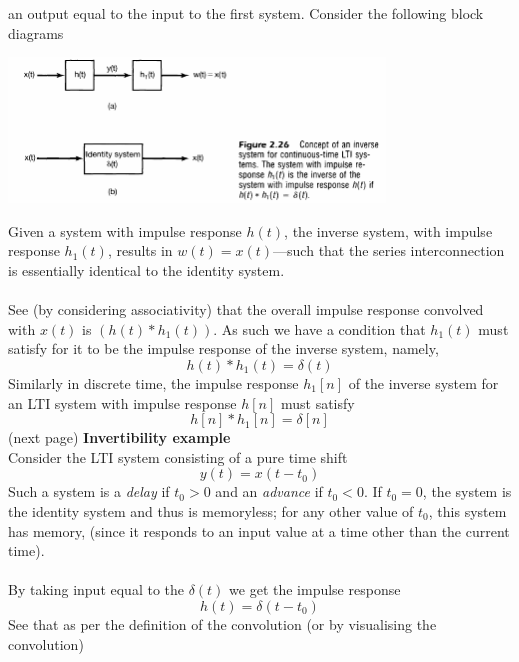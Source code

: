 \documentclass{report}
\begin{document}
an output equal to the input to the first system. Consider the following block diagrams
\begin{center}
\includegraphics[width=10cm]{a47}
\end{center}
Given a system with impulse response $h(t)$, the inverse system, with impulse response $h_1(t)$, results in $w(t)=x(t)$---such that the
series interconnection is essentially identical to the identity system.\\
\vspace{1mm}\\
See (by considering associativity) that the overall impulse response
convolved with $x(t)$ is $(h(t)*h_1(t))$. As such we have a condition
that $h_1(t)$ must satisfy for it to be the impulse response of the inverse system, namely,
\begin{equation*}
h(t)*h_1(t)=\delta(t)
\end{equation*}
Similarly in discrete time, the impulse response $h_1[n]$ of the inverse system for an LTI system with impulse response $h[n]$ must
satisfy
\begin{equation*}
h[n]*h_1[n]=\delta[n]
\end{equation*}
(next page)\newpage
\noindent\textbf{Invertibility example}\\
Consider the LTI system consisting of a pure time shift
\begin{equation*}
y(t)=x(t-t_0)
\end{equation*}
Such a system is a \textit{delay} if $t_0>0$ and an \textit{advance} if $t_0<0$. If $t_0=0$, the system is the identity system and thus
is memoryless; for any other value of $t_0$, this system has memory, (since it responds to an input value at a time other than the current time).\\
\vspace{1mm}\\
By taking input equal to the $\delta(t)$ we get the impulse response
\begin{equation*}
h(t)=\delta(t-t_0)
\end{equation*}
See that as per the definition of the convolution (or by visualising the convolution)
\end{document}
